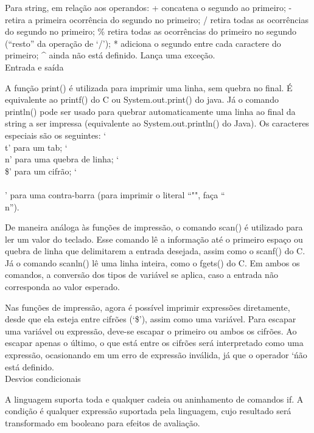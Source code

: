 \documentclass[12pt,a4paper]{article}
\begin{document}
Para string, em relação aos operandos:
+ concatena o segundo ao primeiro;
- retira a primeira ocorrência do segundo no primeiro;
/ retira todas as ocorrências do segundo no primeiro;
\% retira todas as ocorrências do primeiro no segundo (``resto'' da operação de `/');
* adiciona o segundo entre cada caractere do primeiro;
^ ainda não está definido. Lança uma exceção.\\

\hypertarget{Entrada e saída}{\Large{Entrada e saída}}\\[0.3cm]
\normalsize

A função print() é utilizada para imprimir uma linha, sem quebra no final. É equivalente ao printf() do C ou System.out.print() do java. Já o comando println() pode ser usado para quebrar automaticamente uma linha ao final da string a ser impressa (equivalente ao System.out.println() do Java). Os caracteres especiais são os seguintes:
`\\t' para um tab;
`\\n' para uma quebra de linha;
`\\\$' para um cifrão;
`\\\\' para uma contra-barra (para imprimir o literal ``\n"", faça ``\\n'').


De maneira análoga às funções de impressão, o comando scan() é utilizado para ler um valor do teclado. Esse comando lê a informação até o primeiro espaço ou quebra de linha que delimitarem a entrada desejada, assim como o scanf() do C. Já o comando scanln() lê uma linha inteira, como o fgets() do C. Em ambos os comandos, a conversão dos tipos de variável se aplica, caso a entrada não corresponda ao valor esperado.

Nas funções de impressão, agora é possível imprimir expressões diretamente, desde que ela esteja entre cifrões (`\$'), assim como uma variável. Para escapar uma variável ou expressão, deve-se escapar o primeiro ou ambos os cifrões. Ao escapar apenas o último, o que está entre os cifrões será interpretado como uma expressão, ocasionando em um erro de expressão inválida, já que o operador `\' não está definido.\\

\hypertarget{Desvios condicionais}{\Large{Desvios condicionais}}\\[0.3cm]
\normalsize

A linguagem suporta toda e qualquer cadeia ou aninhamento de comandos if. A condição é qualquer expressão suportada pela linguagem, cujo resultado será transformado em booleano para efeitos de avaliação.\\
\end{document}
